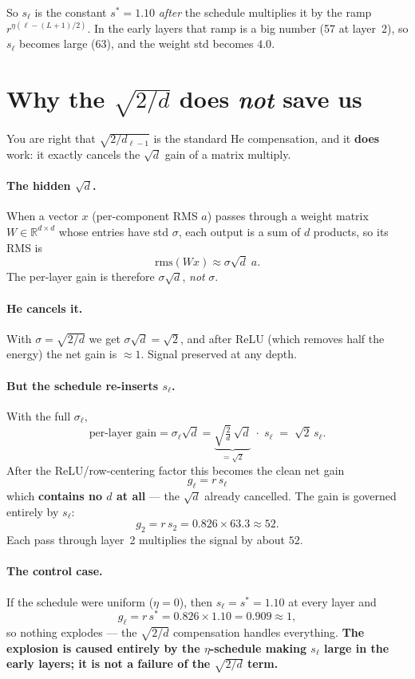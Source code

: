 \documentclass[11pt]{article}
\newcommand{\sstar}{s^{*}}
\begin{document}
So $s_\ell$ is the constant $\sstar=1.10$ \emph{after} the schedule multiplies it by
the ramp $r^{\eta(\ell-(L+1)/2)}$. In the early layers that ramp is a big number
(57 at layer~2), so $s_\ell$ becomes large (63), and the weight std becomes $4.0$.

\section{Why the $\sqrt{2/d}$ does \emph{not} save us}

You are right that $\sqrt{2/d_{\ell-1}}$ is the standard He compensation, and it
\textbf{does} work: it exactly cancels the $\sqrt{d}$ gain of a matrix multiply.

\paragraph{The hidden $\sqrt{d}$.} When a vector $x$ (per-component RMS $a$) passes
through a weight matrix $W\in\mathbb{R}^{d\times d}$ whose entries have std $\sigma$,
each output is a sum of $d$ products, so its RMS is
\[
  \mathrm{rms}(Wx) \approx \sigma \sqrt{d}\; a .
\]
The per-layer gain is therefore $\sigma\sqrt{d}$, \emph{not} $\sigma$.

\paragraph{He cancels it.} With $\sigma=\sqrt{2/d}$ we get
$\sigma\sqrt{d} = \sqrt{2}$, and after ReLU (which removes half the energy) the net
gain is $\approx 1$. Signal preserved at any depth.

\paragraph{But the schedule re-inserts $s_\ell$.} With the full $\sigma_\ell$,
\[
  \text{per-layer gain} = \sigma_\ell \sqrt{d}
  = \underbrace{\sqrt{\tfrac{2}{d}}\,\sqrt{d}}_{=\sqrt 2}\;\cdot\; s_\ell
  \;=\; \sqrt{2}\, s_\ell .
\]
After the ReLU/row-centering factor this becomes the clean net gain
\begin{equation}\label{eq:gain}
  \boxed{\;g_\ell = r\, s_\ell\;}
\end{equation}
which \textbf{contains no $d$ at all} --- the $\sqrt{d}$ already cancelled. The gain
is governed entirely by $s_\ell$:
\[
  g_2 = r\, s_2 = 0.826 \times 63.3 \approx 52 .
\]
Each pass through layer~2 multiplies the signal by about $52$.

\paragraph{The control case.} If the schedule were uniform ($\eta=0$), then
$s_\ell = \sstar = 1.10$ at every layer and
\[
  g_\ell = r\,\sstar = 0.826 \times 1.10 = 0.909 \approx 1 ,
\]
so nothing explodes --- the $\sqrt{2/d}$ compensation handles everything.
\textbf{The explosion is caused entirely by the $\eta$-schedule making $s_\ell$ large
in the early layers; it is not a failure of the $\sqrt{2/d}$ term.}
\end{document}
